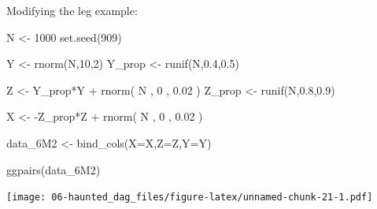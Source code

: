 \documentclass[
]{book}
\newenvironment{Shaded}{\begin{snugshade}}{\end{snugshade}}
\newcommand{\AttributeTok}[1]{\textcolor[rgb]{0.77,0.63,0.00}{#1}}
\newcommand{\DecValTok}[1]{\textcolor[rgb]{0.00,0.00,0.81}{#1}}
\newcommand{\FloatTok}[1]{\textcolor[rgb]{0.00,0.00,0.81}{#1}}
\newcommand{\FunctionTok}[1]{\textcolor[rgb]{0.00,0.00,0.00}{#1}}
\newcommand{\NormalTok}[1]{#1}
\newcommand{\OtherTok}[1]{\textcolor[rgb]{0.56,0.35,0.01}{#1}}
\newcommand{\SpecialCharTok}[1]{\textcolor[rgb]{0.00,0.00,0.00}{#1}}
\begin{document}
Modifying the leg example:

\begin{Shaded}
\begin{Highlighting}[]
\NormalTok{N }\OtherTok{\textless{}{-}} \DecValTok{1000} 
\FunctionTok{set.seed}\NormalTok{(}\DecValTok{909}\NormalTok{) }

\NormalTok{Y }\OtherTok{\textless{}{-}} \FunctionTok{rnorm}\NormalTok{(N,}\DecValTok{10}\NormalTok{,}\DecValTok{2}\NormalTok{)}
\NormalTok{Y\_prop }\OtherTok{\textless{}{-}} \FunctionTok{runif}\NormalTok{(N,}\FloatTok{0.4}\NormalTok{,}\FloatTok{0.5}\NormalTok{) }

\NormalTok{Z }\OtherTok{\textless{}{-}}\NormalTok{ Y\_prop}\SpecialCharTok{*}\NormalTok{Y }\SpecialCharTok{+} \FunctionTok{rnorm}\NormalTok{( N , }\DecValTok{0}\NormalTok{ , }\FloatTok{0.02}\NormalTok{ )}
\NormalTok{Z\_prop }\OtherTok{\textless{}{-}} \FunctionTok{runif}\NormalTok{(N,}\FloatTok{0.8}\NormalTok{,}\FloatTok{0.9}\NormalTok{) }

\NormalTok{X }\OtherTok{\textless{}{-}} \SpecialCharTok{{-}}\NormalTok{Z\_prop}\SpecialCharTok{*}\NormalTok{Z }\SpecialCharTok{+} \FunctionTok{rnorm}\NormalTok{( N , }\DecValTok{0}\NormalTok{ , }\FloatTok{0.02}\NormalTok{ )}

\NormalTok{data\_6M2 }\OtherTok{\textless{}{-}} \FunctionTok{bind\_cols}\NormalTok{(}\AttributeTok{X=}\NormalTok{X,}\AttributeTok{Z=}\NormalTok{Z,}\AttributeTok{Y=}\NormalTok{Y)}

\FunctionTok{ggpairs}\NormalTok{(data\_6M2)}
\end{Highlighting}
\end{Shaded}

\texttt{[image: 06-haunted\_dag\_files/figure-latex/unnamed-chunk-21-1.pdf]}
\end{document}
